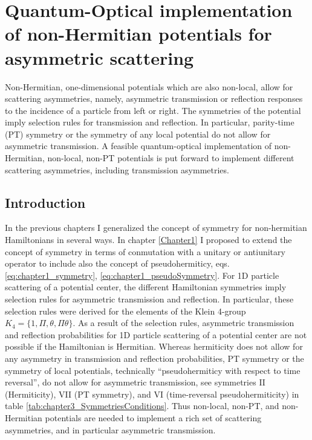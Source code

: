 
\chapter{Quantum-Optical implementation of non-Hermitian potentials for asymmetric scattering}
\label{Chapter3}
%
Non-Hermitian, one-dimensional  potentials which are also non-local,
allow for scattering asymmetries, namely, asymmetric transmission or reflection responses to the incidence of a particle from left or right.
The  symmetries of the potential
imply selection rules for transmission and reflection. In particular, parity-time (PT)
symmetry or the symmetry  of any local potential do not allow for asymmetric transmission.
A feasible quantum-optical implementation
of non-Hermitian, non-local, non-PT potentials is put forward to implement different scattering asymmetries, including transmission
asymmetries.
%
\newpage
%
\section{Introduction}

In the previous chapters I generalized the concept of symmetry for non-hermitian Hamiltonians in several ways. In chapter \ref{Chapter1} I proposed to extend the concept of symmetry in terms of conmutation with a unitary or antiunitary operator to include also the concept of pseudohermiticy, eqs. \eqref{eq:chapter1_symmetry}, \eqref{eq:chapter1_pseudoSymmetry}. For 1D particle scattering of a potential center, the different Hamiltonian symmetries imply selection rules for asymmetric transmission and reflection. In particular, these selection rules were derived for the elements of the Klein 4-group $K_{4}=\lbrace 1,\Pi,\theta,\Pi\theta \rbrace$. As a result of the selection rules, asymmetric transmission and reflection probabilities for 1D particle scattering of a potential center are not possible if the Hamiltonian is Hermitian. Whereas hermiticity does not allow for any asymmetry in transmission and reflection probabilities, PT symmetry or the symmetry of local potentials, technically ``pseudohermiticy with respect to time reversal'', do not allow for asymmetric transmission, see symmetries II (Hermiticity), VII (PT symmetry),  and VI (time-reversal pseudohermiticity) in table \ref{tab:chapter3_SymmetriesConditions}. Thus non-local, non-PT, and non-Hermitian potentials are needed to implement a rich set of scattering asymmetries, and in particular asymmetric transmission.

